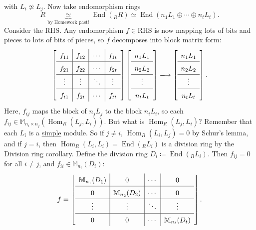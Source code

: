\documentclass[12pt]{article}
\theoremstyle{definition}
\DeclareMathOperator\End{End}
\DeclareMathOperator\Hom{Hom}
\newcommand{\m}{\mathbb{M}}
\begin{document}
with $L_i\not\simeq L_j$. Now take endomorphism rings
\begin{equation}
    R\underbrace{\simeq}_{\text{by Homework past!}}\End(_RR)\simeq\End(n_1L_1\oplus\dotsb\oplus n_tL_t).
\end{equation}
Consider the RHS. Any endomorphism $f\in\mathrm{RHS}$ is now mapping lots of bits and pieces to lots of bits of pieces, so $f$ decomposes into block matrix form:
\begin{equation}
    \left[\def\arraystretch{1.5}
    \begin{array}{c | c | c | c}
        f_{11} & f_{12} & \cdots & f_{1t} \\
        \hline
        f_{21} & f_{22} & \cdots & f_{2t} \\
        \hline 
        \vdots & \vdots & \ddots & \vdots \\
        \hline
        f_{t1} & f_{2t} & \cdots & f_{tt}
    \end{array}
    \right]
    \left[\def\arraystretch{1.5}
    \begin{array}{c}
        n_1L_1 \\
        \hline
        n_2L_2 \\
        \hline 
        \vdots \\
        \hline
        n_tL_t
    \end{array}
    \right]
    \xlongrightarrow{}
    \left[\def\arraystretch{1.5}
    \begin{array}{c}
        n_1L_1 \\
        \hline
        n_2L_2 \\
        \hline 
        \vdots \\
        \hline
        n_tL_t
    \end{array}
    \right].
\end{equation}
Here, $f_{ij}$ maps the block of $n_jL_j$ to the block $n_iL_i$, so each $f_{ij}\in\m_{n_i\times n_j}\left(\Hom_R(L_j,L_i)\right)$. But what is $\Hom_R(L_j,L_i)$? Remember that each $L_i$ is a \underline{simple} module. So if $j\neq i$, $\Hom_R(L_i,L_j)=0$ by Schur's lemma, and if $j=i$, then $\Hom_R(L_i,L_i)=\End(_RL_i)$ is a division ring by the Division ring corollary. Define the division ring $D_i\coloneqq \End(_RL_i)$. Then $f_{ij}=0$ for all $i\neq j$, and $f_{ii}\in\m_{n_i}(D_i)$:
\begin{equation}
    f =  
    \left[\def\arraystretch{1.5}
    \begin{array}{c | c | c | c}
        \m_{n_1}(D_1) & 0 & \cdots & 0 \\
        \hline
        0 & \m_{n_2}(D_2) & \cdots & 0 \\
        \hline 
        \vdots & \vdots & \ddots & \vdots \\
        \hline
        0 & 0 & \cdots & \m_{n_t}(D_t)
    \end{array}
    \right].
\end{equation}
\end{document}
